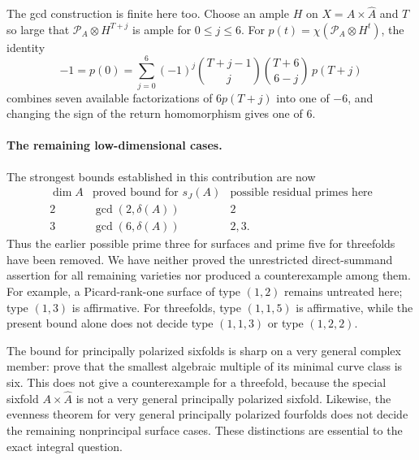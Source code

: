 The gcd construction is finite here too. Choose an ample $H$ on
$X=A\times\widehat A$ and $T$ so large that
$\mathcal P_A\otimes H^{T+j}$ is ample for $0\le j\le6$.
For $p(t)=\chi(\mathcal P_A\otimes H^t)$, the identity
\[
 -1=p(0)=\sum_{j=0}^{6}(-1)^j
          \binom{T+j-1}{j}\binom{T+6}{6-j}\,p(T+j)
\]
combines seven available factorizations of $6p(T+j)$ into one
of $-6$, and changing the sign of the return homomorphism gives
one of $6$.

\paragraph{The remaining low-dimensional cases.}
The strongest bounds established in this contribution are now
\[
\begin{array}{c|c|c}
 \dim A & \text{proved bound for }s_J(A)
        &\text{possible residual primes here}\\\hline
 2 & \gcd(2,\delta(A)) & 2\\
 3 & \gcd(6,\delta(A)) & 2,3.
\end{array}
\]
Thus the earlier possible prime three for surfaces and prime five
for threefolds have been removed. We have neither proved the
unrestricted direct-summand assertion for all remaining varieties
nor produced a counterexample among them. For example, a
Picard-rank-one surface of type $(1,2)$ remains untreated here;
type $(1,3)$ is affirmative. For threefolds, type $(1,1,5)$ is
affirmative, while the present bound alone does not decide
type $(1,1,3)$ or type $(1,2,2)$.

The bound for principally polarized sixfolds is sharp on a very
general complex member: \citet[Theorem 1.2]{frC4EGFSOptimality2025}
prove that the smallest algebraic multiple of its minimal curve
class is six. This does not give a counterexample for a threefold,
because the special sixfold $A\times\widehat A$ is not a very
general principally polarized sixfold. Likewise, the evenness
theorem for very general principally polarized fourfolds does not
decide the remaining nonprincipal surface cases. These distinctions
are essential to the exact integral question.
